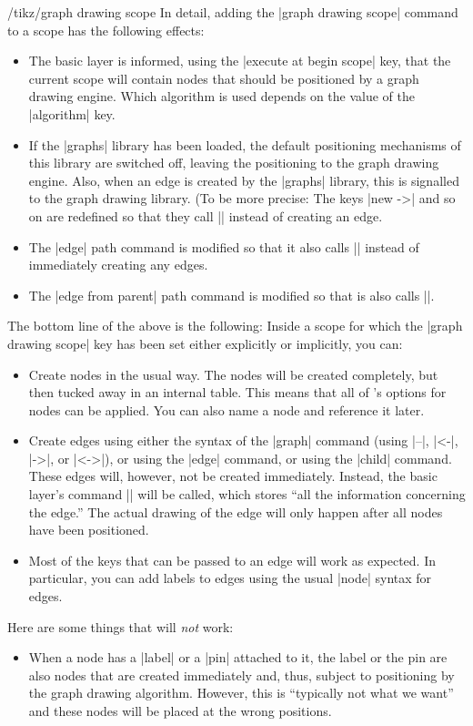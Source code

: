 \begin{key}{/tikz/graph drawing scope}
  In detail, adding the |graph drawing scope| command to a scope has
  the following effects:
  \begin{itemize}
  \item The basic layer is informed, using the
    |execute at begin scope| key, that the current scope will contain
    nodes that should be positioned by a graph drawing engine. Which
    algorithm is used depends on the value of the |algorithm| key.
  \item If the |graphs| library has been loaded, the default
    positioning mechanisms of this library are switched off, leaving
    the positioning to the graph drawing engine. Also, when an edge is
    created by the |graphs| library, this is signalled to the graph
    drawing library. (To be more precise: The keys |new ->| and so on
    are redefined so that they call |\pgfgdedge| instead of creating
    an edge.
  \item The |edge| path command is modified so that it also calls
    |\pgfgdedge| instead of immediately creating any edges.
  \item The |edge from parent| path command is modified so that is
    also calls |\pgfgdedge|.
  \end{itemize}

  The bottom line of the above is the following: Inside a scope for
  which the |graph drawing scope| key has been set either explicitly
  or implicitly, you can:
  \begin{itemize}
  \item Create nodes in the usual way. The nodes will be created
    completely, but then tucked away in an internal table. This means
    that all of \tikzname's options for nodes can be applied. You can
    also name a node and reference it later.
  \item Create edges using either the syntax of the |graph| command
    (using |--|, |<-|, |->|, or |<->|), or using the |edge| command,
    or using the |child| command. These edges will, however, not be
    created immediately. Instead, the basic layer's command
    |\pgfgdedge| will be called, which stores ``all the information
    concerning the edge.'' The actual drawing of the edge will only
    happen after all nodes have been positioned.
  \item Most of the keys that can be passed to an edge will work as
    expected. In particular, you can add labels to edges using the
    usual |node| syntax for edges.
  \end{itemize}
  Here are some things that will \emph{not} work:
  \begin{itemize}
  \item When a node has a |label| or a |pin| attached to it, the label
    or the pin are also nodes  that are created immediately and, thus,
    subject to positioning by the graph drawing algorithm. However,
    this is ``typically not what we want'' and these nodes will be
    placed at the wrong positions. 


\end{itemize}
\end{key}
